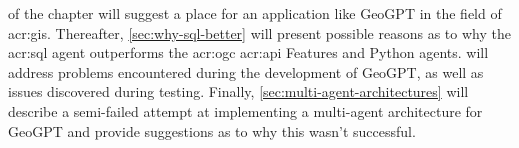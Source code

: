 \begin{comment}

In this section it is important to include a discussion of not just the merits of the work conducted, but also the limitations.
Which choices did you make? Why? What alternatives were there?
{\color{red}\textbf{Note that a key part of the Master's Thesis grading is based on the student's ability to discuss the results in light of the work by others as well as the restrictions and potential of the work itself.}}
While the Results section will report the outcome of each specific experiments, the Discussion should put those results into perspective and look at overall lessons that can be learned from the entire series of experiments.

You should be able to discuss your work in relation to its overall goal and your research questions (i.e., those introduced in Chapter~\ref{cha:introduction}),
but also address issues such as any ethical considerations that the work may entail,
as well as its technical challenges and limitations.

Discussion and evaluation can either be two different chapters, a joint chapter (as here), or part of the concluding chapter
--- or the discussion can be part of that chapter while the evaluation is part of the experimental chapter.

As for most parts of the thesis, it is possible to select various outlines and setups for the discussion; the important thing is that all the relevant parts appear \textit{somewhere\/} in the text.
\end{comment}

 of the  chapter will suggest a place for an application like GeoGPT in the field of \acrshort{acr:gis}. Thereafter, \autoref{sec:why-sql-better} will present possible reasons as to why the \acrshort{acr:sql} agent outperforms the \acrshort{acr:ogc} \acrshort{acr:api} Features and Python agents.  will address problems encountered during the development of GeoGPT, as well as issues discovered during testing. Finally, \autoref{sec:multi-agent-architectures} will describe a semi-failed attempt at implementing a multi-agent architecture for GeoGPT and provide suggestions as to why this wasn't successful.




